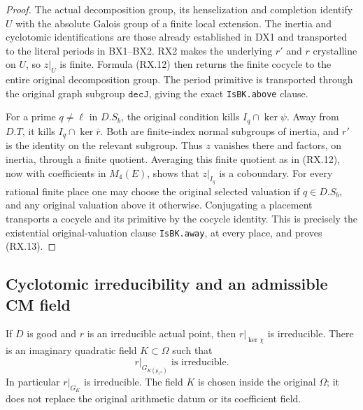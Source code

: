 \begin{proof}
The actual decomposition group, its henselization and completion
identify $U$ with the absolute Galois group of a finite local
extension.  The inertia and cyclotomic identifications are those
already established in DX1 and transported to the literal periods
in BX1--BX2.  RX2 makes the underlying $r'$ and $r$ crystalline on
$U$, so $z|_U$ is finite.  Formula (RX.12) then returns the finite
cocycle to the entire original decomposition group.  The period
primitive is transported through the original graph subgroup
$\texttt{decJ}$, giving the exact \texttt{IsBK.above} clause.

For a prime $q\ne\ell$ in $D.S_b$, the original condition kills
$I_q\cap\ker\psi$.  Away from $D.T$, it kills
$I_q\cap\ker\bar r$.  Both are finite-index normal subgroups of
inertia, and $r'$ is the identity on the relevant subgroup.
Thus $z$ vanishes there and factors, on inertia, through a finite
quotient.  Averaging this finite quotient as in (RX.12), now with
coefficients in $M_4(E)$, shows that $z|_{I_q}$ is a coboundary.
For every rational finite place one may choose the original selected
valuation if $q\in D.S_b$, and any original valuation above it
otherwise.  Conjugating a placement transports a cocycle and its
primitive by the cocycle identity.  This is precisely the
existential original-valuation clause \texttt{IsBK.away}, at every
place, and proves (RX.13).
\end{proof}

\subsection{Cyclotomic irreducibility and an admissible CM field}

\begin{proposition}
\label{prop:rx-cyclotomic-irreducibility}
If $D$ is good and $r$ is an irreducible actual point, then
$r|_{\ker\chi}$ is irreducible.  There is an imaginary quadratic
field $K\subset\Omega$ such that
\[
       r|_{G_{K(\mu_{\ell^\infty})}}\text{ is irreducible}.
 \tag{RX.16}
\]
In particular $r|_{G_K}$ is irreducible.  The field $K$ is chosen
inside the original $\Omega$; it does not replace the original
arithmetic datum or its coefficient field.
\end{proposition}


